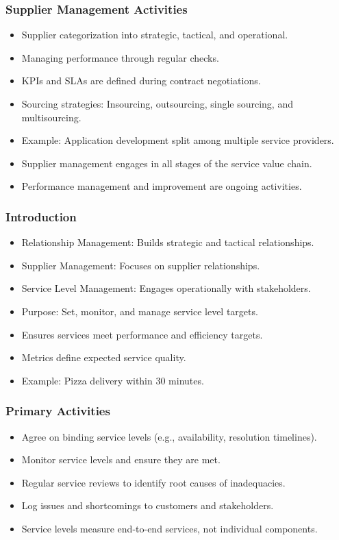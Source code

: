 \documentclass[aspectratio=169, table]{beamer}
\begin{document}
\begin{frame}
	\frametitle{Supplier Management Activities}
	
	\begin{itemize}
		\item Supplier categorization into strategic, tactical, and operational.
		\item Managing performance through regular checks.
		\item KPIs and SLAs are defined during contract negotiations.
		\item Sourcing strategies: Insourcing, outsourcing, single sourcing, and multisourcing.
		\item Example: Application development split among multiple service providers.
		\item Supplier management engages in all stages of the service value chain.
		\item Performance management and improvement are ongoing activities.
	\end{itemize}
	
\end{frame}

\begin{frame}
	\frametitle{Introduction}
	\begin{itemize}
		\item Relationship Management: Builds strategic and tactical relationships.
		\item Supplier Management: Focuses on supplier relationships.
		\item Service Level Management: Engages operationally with stakeholders.
		\item Purpose: Set, monitor, and manage service level targets.
		\item Ensures services meet performance and efficiency targets.
		\item Metrics define expected service quality.
		\item Example: Pizza delivery within 30 minutes.
	\end{itemize}
\end{frame}

\begin{frame}
	\frametitle{Primary Activities}
	\begin{itemize}
		\item Agree on binding service levels (e.g., availability, resolution timelines).
		\item Monitor service levels and ensure they are met.
		\item Regular service reviews to identify root causes of inadequacies.
		\item Log issues and shortcomings to customers and stakeholders.
		\item Service levels measure end-to-end services, not individual components.
	\end{itemize}
\end{frame}
\end{document}
